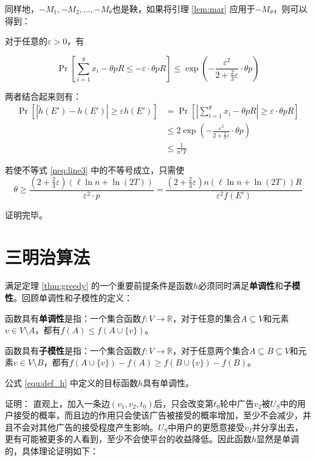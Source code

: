 同样地，$-M_1,-M_2,\ldots,-M_\theta$也是鞅，如果将引理 \ref{lem:mar} 应用于$-M_{\theta}$，则可以得到：

对于任意的$\varepsilon>0$，有

\begin{equation}
\Pr\left[\sum_{i=1}^{\theta}x_i- \theta pR \le - \varepsilon \cdot \theta p R\right] \le \exp(-\frac{\varepsilon^2}{2+\frac{2}{3}\varepsilon}\cdot \theta p)
\end{equation}

两者结合起来则有：
\begin{align}
    \Pr[|\tilde{h}(E')-h(E')|\ge \varepsilon h(E')] 
    &=\Pr\left[\left|\sum_{i=1}^{\theta}x_i- \theta pR \right|\ge \varepsilon \cdot \theta p R\right] \\ 
    & \le 2\exp(-\frac{\varepsilon^2}{2+\frac{2}{3}\varepsilon}\cdot \theta p) \\
    & \le \frac{1}{n^{\ell}T} \label{neq:line3}
\end{align}

若使不等式 \ref{neq:line3} 中的不等号成立，只需使
\begin{equation}
\theta \ge \frac{(2+\frac{2}{3}\varepsilon)(\ell\ln n+\ln(2T))}{\varepsilon^2\cdot p}=\frac{(2+\frac{2}{3}\varepsilon)n(\ell\ln n+\ln(2T)) R}{\varepsilon^2f(E')}
\end{equation}

\noindent 证明完毕。

\section{三明治算法}
\label{sec:sand}
满足定理 \ref{thm:greedy} 的一个重要前提条件是函数$h$必须同时满足{\bfseries 单调性}和{\bfseries 子模性}\cite{nemhauser1978analysis}。回顾单调性和子模性的定义：

函数具有{\bfseries 单调性}是指：一个集合函数$f:V\to \mathbb{R}$，对于任意的集合$A \subseteq V$和元素$v \in V\setminus A$，都有$f(A)\le f(A\cup\{v\})$。

函数具有{\bfseries 子模性}是指：一个集合函数$f:V\to \mathbb{R}$，对于任意两个集合$A\subseteq B \subseteq V$和元素$v \in V \setminus B$，都有$f(A \cup \{v\})-f(A) \ge f(B\cup \{v\})-f(B)$。
\begin{lemma}
\label{lem:h_mon}
公式 \ref{equ:def_h} 中定义的目标函数$h$具有单调性。
\end{lemma}
\noindent 证明：
直观上，加入一条边$(v_1,v_2,t_0)$后，只会改变第$t_0$轮中广告$v_2$被$U_S$中的用户接受的概率，而且边的作用只会使该广告被接受的概率增加，至少不会减少，并且不会对其他广告的接受程度产生影响。$U_S$中用户的更愿意接受$v_2$并分享出去，更有可能被更多的人看到，至少不会使平台的收益降低。因此函数$h$显然是单调的，具体理论证明如下：

